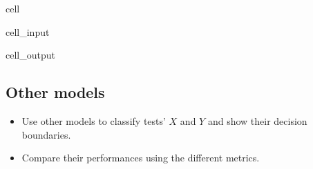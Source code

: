 \documentclass[letterpaper,10pt,english]{jupyterBook}
\begin{document}
\begin{sphinxuseclass}{cell}
\begin{sphinxVerbatimInput}
\begin{sphinxuseclass}{cell_input}
\begin{sphinxVerbatim}[commandchars=\\\{\}]
 
    
\PYG{p}{[} \PYG{p}{]} \PYG{p}{[} \PYG{p}{]}   
\end{sphinxVerbatim}

\end{sphinxuseclass}\end{sphinxVerbatimInput}
\begin{sphinxVerbatimOutput}

\begin{sphinxuseclass}{cell_output}
\noindent{}

\end{sphinxuseclass}\end{sphinxVerbatimOutput}

\end{sphinxuseclass}

\subsection{Other models}
\label{\detokenize{06:other-models}}\begin{itemize}
\item {} 
\sphinxAtStartPar
Use other models to classify tests’ \(X\) and \(Y\) and show their decision boundaries.

\item {} 
\sphinxAtStartPar
Compare their performances using the different metrics.

\end{itemize}
\end{document}
